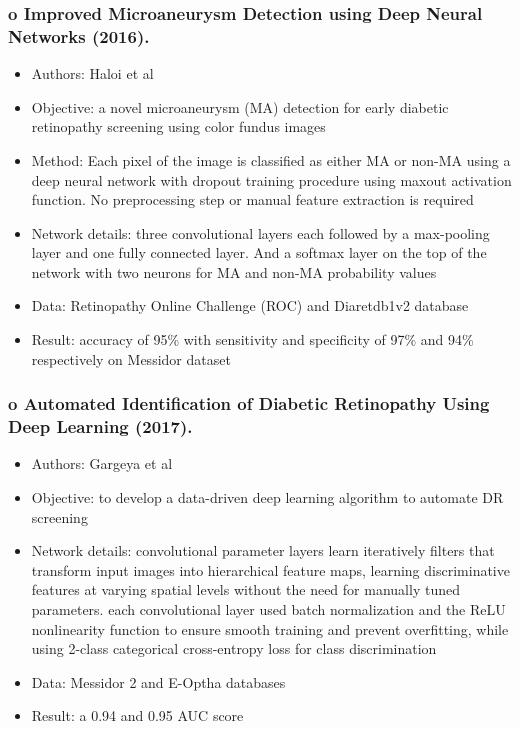 \documentclass[12pt]{report}
\begin{document}
\subsubsection{o Improved Microaneurysm Detection using Deep Neural Networks (2016). \cite{haloi2015improved}}
\begin{itemize}
\item Authors: Haloi et al
\item Objective: a novel microaneurysm (MA) detection for early diabetic retinopathy screening using color fundus images
\item Method: Each pixel of the image is classified as either MA or non-MA using a deep neural network with dropout training procedure using maxout activation function. No preprocessing step or manual feature extraction is required
\item Network details: three convolutional layers each followed by a max-pooling layer and one fully connected layer. And a softmax layer on the top of the network with two neurons for MA and non-MA probability values
\item Data: Retinopathy Online Challenge (ROC) and Diaretdb1v2 database
\item Result: accuracy of 95\% with sensitivity and specificity of 97\% and 94\% respectively on Messidor dataset
\end{itemize}

\subsubsection{o Automated Identification of Diabetic Retinopathy Using Deep Learning (2017). \cite{gargeya2017automated}}
\begin{itemize}
\item Authors: Gargeya et al
\item Objective: to develop a data-driven deep learning algorithm to automate DR screening
\item Network details: convolutional parameter layers learn iteratively filters that transform input images into hierarchical feature maps, learning discriminative features at varying spatial levels without the need for manually tuned parameters. each convolutional layer used batch normalization and the ReLU nonlinearity function to ensure smooth training and prevent overfitting, while using 2-class categorical cross-entropy loss for class discrimination
\item Data: Messidor 2 and E-Optha databases
\item Result: a 0.94 and 0.95 AUC score
\end{itemize}
\end{document}
